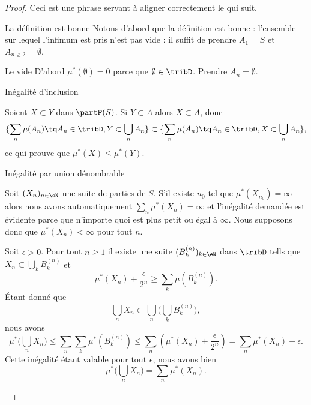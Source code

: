 \begin{proof}
    Ceci est une phrase servant à aligner correctement le  qui suit.
    \begin{subproof}
    \item[La définition est bonne]
    Notons d'abord que la définition est bonne : l'ensemble sur lequel l'infimum est pris n'est pas vide : il suffit de prendre \( A_1=S\) et \( A_{n\geq 2}=\emptyset\).
    \item[Le vide]
        D'abord \( \mu^*(\emptyset)=0\) parce que \( \emptyset\in\tribD\). Prendre \( A_n=\emptyset\).
    \item[Inégalité d'inclusion]

        Soient \( X\subset Y\) dans \( \partP(S)\). Si \( Y\subset A\) alors \( X\subset A\), donc
        \begin{equation}
            \{ \sum_n\mu(A_n)\tq A_n\in\tribD,Y\subset\bigcup_nA_n \} \subset\{ \sum_n\mu(A_n)\tq A_n\in\tribD,X\subset\bigcup_nA_n \} ,
        \end{equation}
        ce qui prouve que \( \mu^*(X)\leq \mu^*(Y)\).
    \item[Inégalité par union dénombrable]

        Soit \( (X_n)_{n\in \eN}\) une suite de parties de \( S\). S'il existe \( n_0\) tel que \( \mu^*(X_{n_0})=\infty\) alors nous avons automatiquement \( \sum_n\mu^*(X_n)=\infty\) et l'inégalité demandée est évidente parce que n'importe quoi est plus petit ou égal à \( \infty\). Nous supposons donc que \( \mu^*(X_n)<\infty\) pour tout \( n\).

        Soit \( \epsilon>0\). Pour tout \( n\geq 1\) il existe une suite \( (B_k^{(n)})_{k\in \eN}\) dans \( \tribD\) tells que \( X_n\subset\bigcup_kB_k^{(n)}\) et
        \begin{equation}
            \mu^*(X_n)+\frac{ \epsilon }{ 2^n }\geq \sum_k\mu(B_k^{(n)}).
        \end{equation}
        Étant donné que
        \begin{equation}
            \bigcup_nX_n\subset\bigcup_n\big( \bigcup_kB_k^{(n)} \big),
        \end{equation}
        nous avons
        \begin{equation}
            \mu^*\big( \bigcup_nX_n \big)\leq \sum_n\sum_k\mu^*(B_k^{(n)})\leq \sum_n\left( \mu^*(X_n)+\frac{ \epsilon }{ 2^n } \right)=\sum_n\mu^*(X_n)+\epsilon.
        \end{equation}
        Cette inégalité étant valable pour tout \( \epsilon\), nous avons bien
        \begin{equation}
            \mu^*\big( \bigcup_nX_n \big)=\sum_n\mu^*(X_n).
        \end{equation}


\end{subproof}
\end{proof}
